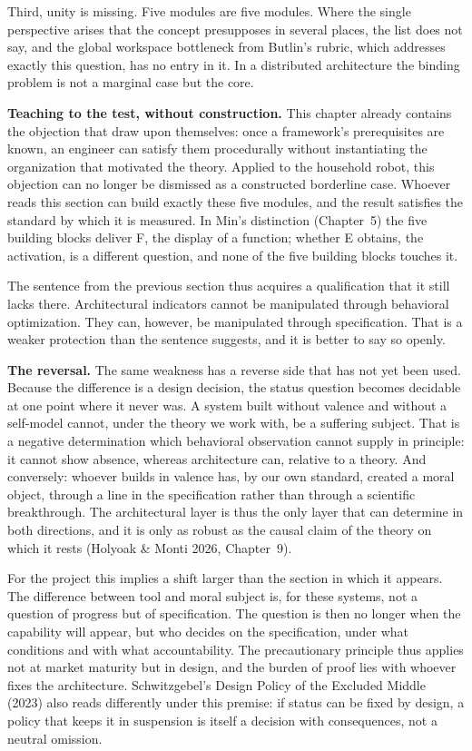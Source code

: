 \documentclass[acmlarge, nonacm]{acmart}
\begin{document}
Third, unity is missing. Five modules are five modules. Where the single perspective arises that the concept presupposes in several places, the list does not say, and the global workspace bottleneck from Butlin's rubric, which addresses exactly this question, has no entry in it. In a distributed architecture the binding problem is not a marginal case but the core.

\textbf{Teaching to the test, without construction.} This chapter already contains the objection that \citet{tait2026} draw upon themselves: once a framework's prerequisites are known, an engineer can satisfy them procedurally without instantiating the organization that motivated the theory. Applied to the household robot, this objection can no longer be dismissed as a constructed borderline case. Whoever reads this section can build exactly these five modules, and the result satisfies the standard by which it is measured. In Min's distinction (Chapter~5) the five building blocks deliver F, the display of a function; whether E obtains, the activation, is a different question, and none of the five building blocks touches it.

The sentence from the previous section thus acquires a qualification that it still lacks there. Architectural indicators cannot be manipulated through behavioral optimization. They can, however, be manipulated through specification. That is a weaker protection than the sentence suggests, and it is better to say so openly.

\textbf{The reversal.} The same weakness has a reverse side that has not yet been used. Because the difference is a design decision, the status question becomes decidable at one point where it never was. A system built without valence and without a self-model cannot, under the theory we work with, be a suffering subject. That is a negative determination which behavioral observation cannot supply in principle: it cannot show absence, whereas architecture can, relative to a theory. And conversely: whoever builds in valence has, by our own standard, created a moral object, through a line in the specification rather than through a scientific breakthrough. The architectural layer is thus the only layer that can determine in both directions, and it is only as robust as the causal claim of the theory on which it rests (Holyoak \& Monti 2026, Chapter~9).

For the project this implies a shift larger than the section in which it appears. The difference between tool and moral subject is, for these systems, not a question of progress but of specification. The question is then no longer when the capability will appear, but who decides on the specification, under what conditions and with what accountability. The precautionary principle thus applies not at market maturity but in design, and the burden of proof lies with whoever fixes the architecture. Schwitzgebel's Design Policy of the Excluded Middle (2023) also reads differently under this premise: if status can be fixed by design, a policy that keeps it in suspension is itself a decision with consequences, not a neutral omission.
\end{document}
